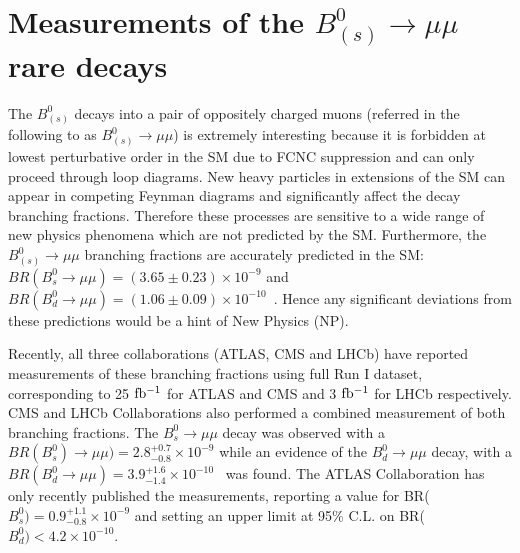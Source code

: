 %
%
%
%
%
%
%
%
%
\section{Measurements of the $B^0_{(s)} \to \mu\mu$ rare decays}
The $B^0_{(s)}$ decays into a pair of oppositely charged muons (referred in the following to as $B^0_{(s)} \to \mu\mu$) is extremely interesting because it is forbidden at lowest perturbative order in the SM due to FCNC suppression and can only proceed through loop diagrams. New heavy particles in extensions of the SM can appear in competing Feynman diagrams and significantly affect the decay branching fractions. Therefore these processes are sensitive to a wide range of new physics phenomena which are not predicted by the SM. Furthermore, the $B^0_{(s)} \to \mu\mu$ branching fractions are accurately predicted in the SM: $BR(B^0_s \to \mu\mu) = (3.65 \pm 0.23) \times 10^{-9}$ and $BR(B^0_d \to \mu\mu) = (1.06 \pm 0.09) \times 10^{-10}$~\cite{Bobeth}. Hence any significant deviations from these predictions would be a hint of New Physics (NP).

Recently, all three collaborations (ATLAS,  CMS and LHCb) have reported measurements of these branching fractions using full Run I dataset, corresponding to 25 $\rm{fb^{-1}}$ for ATLAS and CMS and 3 $\rm{fb^{-1}}$ for LHCb respectively. CMS and LHCb Collaborations also performed a combined measurement of both branching fractions. The $B^0_s \to \mu\mu$ decay was observed with a $BR(B^0_s) \to \mu\mu) = 2.8^{+0.7}_{-0.8} \times 10^{-9}$ while an evidence of the  $B^0_d \to \mu\mu$ decay, with a  $BR(B^0_d \to \mu\mu) = 3.9^{+1.6}_{-1.4} \times 10^{-10}$~\cite{Nature} was found.
The ATLAS Collaboration has only recently published the measurements, reporting a value for BR($B^0_s) = 0.9^{+1.1}_{-0.8}\times 10^{-9}$ and setting an upper limit at 95\% C.L. on  BR($B^0_d) < 4.2 \times 10^{-10}$.~\cite{ATLAS_Bmumu}

